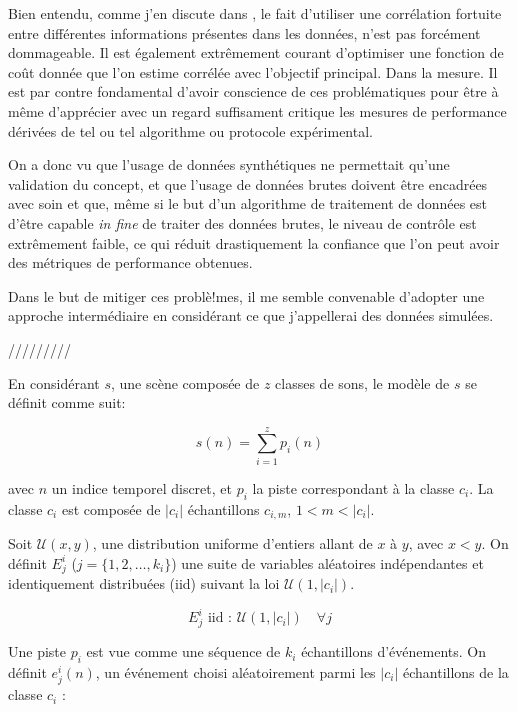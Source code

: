 Bien entendu, comme j'en discute dans \cite{}, le fait d'utiliser une corrélation fortuite entre différentes informations présentes dans les données, n'est pas forcément dommageable. Il est également extrêmement courant d'optimiser une fonction de coût donnée que l'on estime corrélée avec l'objectif principal. Dans la mesure. Il est par contre fondamental d'avoir conscience de ces problématiques pour être à même d'apprécier avec un regard suffisament critique les mesures de performance dérivées de tel ou tel algorithme ou protocole expérimental.

On a donc vu que l'usage de données synthétiques ne permettait qu'une validation du concept, et que l'usage de données brutes doivent être encadrées avec soin et que, même si le but d'un algorithme de traitement de données est d'être capable \textit{in fine} de traiter des données brutes, le niveau de contrôle est extrêmement faible, ce qui réduit drastiquement la confiance que l'on peut avoir des métriques de performance obtenues.

Dans le but de mitiger ces problè!mes, il me semble convenable d'adopter une approche intermédiaire en considérant ce que j'appellerai des données simulées.


/////////

En considérant $s$, une scène composée de $z$ classes de sons, le modèle de $s$ se définit comme suit:

\begin{equation}
s(n)=\sum_{i=1}^{z}p_i(n)
\end{equation}

avec $n$ un indice temporel discret, et $p_i$ la piste correspondant à la classe $c_i$. La classe $c_i$ est composée de $\vert c_i\vert$ échantillons $c_{i,m}$, $1<m<\vert c_i\vert$.

Soit $\mathcal{U}(x,y)$, une distribution uniforme d'entiers allant de $x$ à $y$, avec $x<y$. On définit $E_j^i$ ($j=\lbrace 1,2,\ldots,k_i\rbrace$) une suite de variables aléatoires indépendantes et identiquement distribuées (iid) suivant la loi $\mathcal{U}(1,\vert c_i \vert)$.

\begin{equation}
E_j^i \textrm{ iid : } \mathcal{U}(1,\vert c_i \vert) \quad \forall j
\end{equation}

Une piste $p_i$ est vue comme une séquence de $k_i$ échantillons d'événements. On définit $e_j^i(n)$, un événement choisi aléatoirement parmi les $\vert c_i\vert$ échantillons de la classe $c_i$ :

